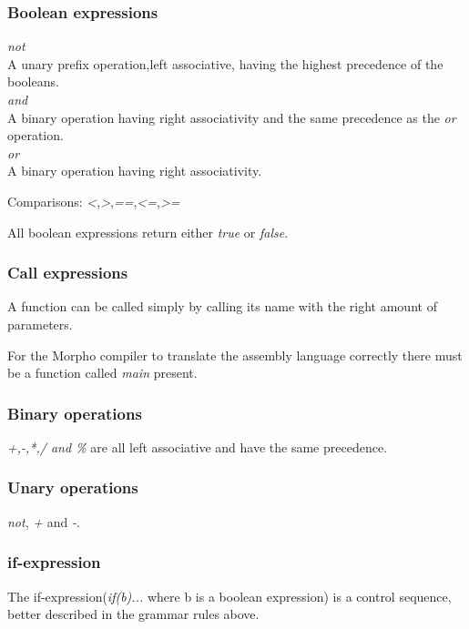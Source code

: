 \documentclass[12pt]{article}
\begin{document}
\subsubsection{Boolean expressions}
\emph{not} \\
A unary prefix operation,left associative, having the highest precedence of the booleans.\\\newline
\emph{and} \\
A binary operation having right associativity and the same precedence as the \emph{or} operation.\\\newline
\emph{or} \\
A binary operation having right associativity.\\\newline

Comparisons: \emph{<},\emph{>},\emph{==},\emph{<=},\emph{>=}\\\newline

All boolean expressions return either \emph{true} or \emph{false}. 

\subsubsection{Call expressions}
A function can be called simply by calling its name with the right amount of parameters.

For the Morpho compiler to translate the assembly language correctly there must be a function called \emph{main} present.

\subsubsection{Binary operations}
\emph{+,-,*,/ and \%} are all left associative and have the same precedence.

\subsubsection{Unary operations}
\emph{not}, \emph{+} and \emph{-}.

\subsubsection{if-expression}
The if-expression(\emph{if(b)...} where b is a boolean expression) is a control sequence, better described in the grammar rules above.
\end{document}
